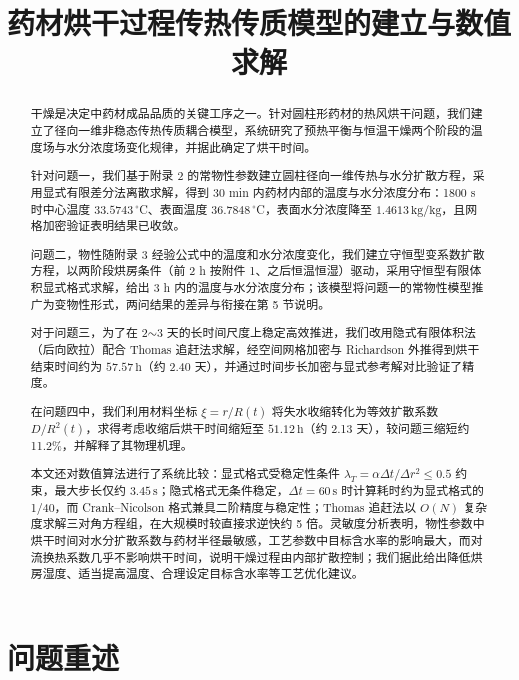 \documentclass[withoutpreface,bwprint]{cumcmthesis} %
\title{药材烘干过程传热传质模型的建立与数值求解}
\begin{document}
\maketitle

\begin{abstract}
干燥是决定中药材成品品质的关键工序之一。针对圆柱形药材的热风烘干问题，我们建立了径向一维非稳态传热传质耦合模型，系统研究了预热平衡与恒温干燥两个阶段的温度场与水分浓度场变化规律，并据此确定了烘干时间。

针对问题一，我们基于附录 2 的常物性参数建立圆柱径向一维传热与水分扩散方程，采用显式有限差分法离散求解，得到 30 min 内药材内部的温度与水分浓度分布：1800 s 时中心温度 $33.5743\,{}^\circ$C、表面温度 $36.7848\,{}^\circ$C，表面水分浓度降至 $1.4613\,\mathrm{kg/kg}$，且网格加密验证表明结果已收敛。

问题二，物性随附录 3 经验公式中的温度和水分浓度变化，我们建立守恒型变系数扩散方程，以两阶段烘房条件（前 2 h 按附件 1、之后恒温恒湿）驱动，采用守恒型有限体积显式格式求解，给出 3 h 内的温度与水分浓度分布；该模型将问题一的常物性模型推广为变物性形式，两问结果的差异与衔接在第 5 节说明。

对于问题三，为了在 2$\sim$3 天的长时间尺度上稳定高效推进，我们改用隐式有限体积法（后向欧拉）配合 Thomas 追赶法求解，经空间网格加密与 Richardson 外推得到烘干结束时间约为 $57.57\,\mathrm{h}$（约 2.40 天），并通过时间步长加密与显式参考解对比验证了精度。

在问题四中，我们利用材料坐标 $\xi=r/R(t)$ 将失水收缩转化为等效扩散系数 $D/R^2(t)$，求得考虑收缩后烘干时间缩短至 $51.12\,\mathrm{h}$（约 2.13 天），较问题三缩短约 11.2\%，并解释了其物理机理。

本文还对数值算法进行了系统比较：显式格式受稳定性条件 $\lambda_T=\alpha\Delta t/\Delta r^2\le 0.5$ 约束，最大步长仅约 $3.45\,\mathrm{s}$；隐式格式无条件稳定，$\Delta t=60\,\mathrm{s}$ 时计算耗时约为显式格式的 1/40，而 Crank--Nicolson 格式兼具二阶精度与稳定性；Thomas 追赶法以 $O(N)$ 复杂度求解三对角方程组，在大规模时较直接求逆快约 5 倍。灵敏度分析表明，物性参数中烘干时间对水分扩散系数与药材半径最敏感，工艺参数中目标含水率的影响最大，而对流换热系数几乎不影响烘干时间，说明干燥过程由内部扩散控制；我们据此给出降低烘房湿度、适当提高温度、合理设定目标含水率等工艺优化建议。

\end{abstract}

\tableofcontents
\newpage

\section{问题重述}
\end{document}
